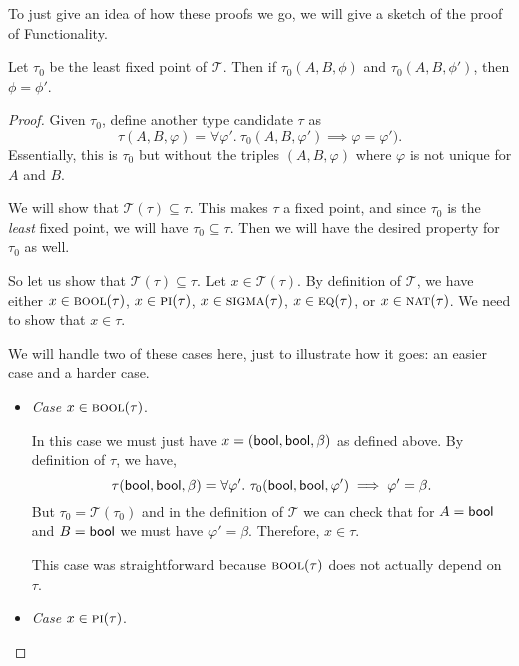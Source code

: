 \documentclass{article} \usepackage{chtt-notes} \usepackage{stmaryrd}
\newcommand{\T}{\mathcal{T}}
\begin{document}
To just give an idea of how these proofs we go, we will give a sketch of the proof
of Functionality.

\begin{theorem*}[Functionality]
Let $\tau_0$ be the least fixed point of $\T$. Then if
$\tau_0(A, B, \phi)$ and $\tau_0(A, B, \phi')$, then $\phi = \phi'$.
\end{theorem*}
\begin{proof}
  Given $\tau_0$, define another type candidate $\tau$ as
  \[ \tau(A,B,\varphi) = \forall \varphi' .~ \tau_0(A,B,\varphi') \implies \varphi = \varphi'). \]
  Essentially, this is $\tau_0$ but without the triples $(A,B,\varphi)$ where $\varphi$ is not
  unique for $A$ and $B$.

  We will show that $\T(\tau) \subseteq \tau$. This makes $\tau$ a fixed point, and since
  $\tau_0$ is the \emph{least} fixed point, we will have $\tau_0 \subseteq \tau$. Then we
  will have the desired property for $\tau_0$ as well.

  So let us show that $\T(\tau) \subseteq \tau$. Let $x \in \T(\tau)$. By definition of
  $\T$, we have either
  $x \in \textsc{bool}(\tau)$,
  $x \in \textsc{pi}(\tau)$,
  $x \in \textsc{sigma}(\tau)$,
  $x \in \textsc{eq}(\tau)$, or
  $x \in \textsc{nat}(\tau)$. We need to show that $x \in \tau$.

  We will handle two of these cases here, just to illustrate how it goes: an easier case and a harder case.
  \begin{itemize}
    \item \emph{Case} $x \in \textsc{bool}(\tau)$.

    In this case we must just have $x = (\mathsf{bool}, \mathsf{bool}, \beta)$ as defined above.
    By definition of $\tau$, we have,
    \[ \tau(\mathsf{bool}, \mathsf{bool}, \beta) = \forall \varphi' .~ \tau_0(\mathsf{bool},\mathsf{bool},\varphi') \implies \varphi' = \beta. \]
    But $\tau_0 = \T(\tau_0)$ and in the definition of $\T$ we can check that
    for $A=\mathsf{bool}$ and $B=\mathsf{bool}$ we must have $\varphi' = \beta$. Therefore,
    $x \in \tau$.

    This case was straightforward because $\textsc{bool}(\tau)$ does not actually depend
    on $\tau$.

    \item \emph{Case} $x \in \textsc{pi}(\tau)$.


\end{itemize}
\end{proof}
\end{document}
